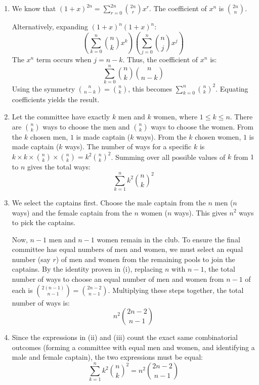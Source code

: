 \begin{solution}
  \begin{enumerate}[label=\roman*., leftmargin=*]
      \item We know that $(1+x)^{2n} = \sum_{r=0}^{2n} \binom{2n}{r} x^r$. The coefficient of $x^n$ is $\binom{2n}{n}$. 
      
      Alternatively, expanding $(1+x)^n(1+x)^n$:
      $$ \left( \sum_{k=0}^n \binom{n}{k}x^k \right) \left( \sum_{j=0}^n \binom{n}{j}x^j \right) $$
      The $x^n$ term occurs when $j = n-k$. Thus, the coefficient of $x^n$ is:
      $$ \sum_{k=0}^n \binom{n}{k}\binom{n}{n-k} $$
      Using the symmetry $\binom{n}{n-k} = \binom{n}{k}$, this becomes $\sum_{k=0}^n \binom{n}{k}^2$. Equating coefficients yields the result.
      
      \item Let the committee have exactly $k$ men and $k$ women, where $1 \le k \le n$. 
      There are $\binom{n}{k}$ ways to choose the men and $\binom{n}{k}$ ways to choose the women. 
      From the $k$ chosen men, $1$ is made captain ($k$ ways). From the $k$ chosen women, $1$ is made captain ($k$ ways). 
      The number of ways for a specific $k$ is $k \times k \times \binom{n}{k} \times \binom{n}{k} = k^2 \binom{n}{k}^2$. 
      Summing over all possible values of $k$ from $1$ to $n$ gives the total ways:
      $$ \sum_{k=1}^{n} k^2 \binom{n}{k}^2 $$
      
      \item We select the captains first. Choose the male captain from the $n$ men ($n$ ways) and the female captain from the $n$ women ($n$ ways). This gives $n^2$ ways to pick the captains.
      
      Now, $n-1$ men and $n-1$ women remain in the club. To ensure the final committee has equal numbers of men and women, we must select an equal number (say $r$) of men and women from the remaining pools to join the captains. 
      By the identity proven in (i), replacing $n$ with $n-1$, the total number of ways to choose an equal number of men and women from $n-1$ of each is $\binom{2(n-1)}{n-1} = \binom{2n-2}{n-1}$. 
      Multiplying these steps together, the total number of ways is:
      $$ n^2 \binom{2n-2}{n-1} $$
      
      \item Since the expressions in (ii) and (iii) count the exact same combinatorial outcomes (forming a committee with equal men and women, and identifying a male and female captain), the two expressions must be equal:
      $$ \sum_{k=1}^{n} k^2 \binom{n}{k}^2 = n^2 \binom{2n-2}{n-1} $$
  \end{enumerate}
\end{solution}

